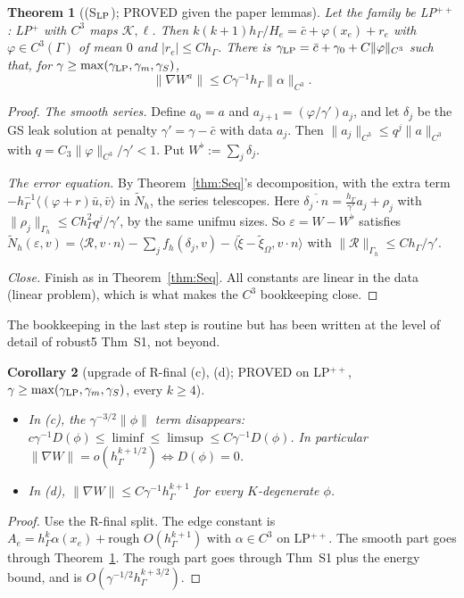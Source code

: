 \documentclass[11pt]{article}
\newtheorem{theorem}{Theorem}[section]
\newtheorem{corollary}[theorem]{Corollary}
\theoremstyle{remark}
\newcommand{\hG}{h_\Gamma}
\newcommand{\Gh}{\Gamma_h}
\newcommand{\ip}[2]{\langle #1,#2\rangle}
\begin{document}
\begin{theorem}[(S$_{\rm LP}$); PROVED given the paper lemmas]\label{thm:SLP}
Let the family be LP$^{++}$: LP$^+$ with $C^3$ maps $\mathcal K,\ell$. Then $k(k+1)\hG/H_e=\bar c+\varphi(x_e)+r_e$ with
$\varphi\in C^3(\Gamma)$ of mean $0$ and $|r_e|\le C\hG$. There is $\gamma_{\rm LP}=\bar c+\gamma_0+C\|\varphi\|_{C^3}$ such that, for
$\gamma\ge\max(\gamma_{\rm LP},\gamma_m,\gamma_S)$,
\[
\|\nabla W^a\|\le C\gamma^{-1}\hG\|\alpha\|_{C^3}.
\]
\end{theorem}
\begin{proof}
\emph{The smooth series.} Define $a_0=a$ and $a_{j+1}=(\varphi/\gamma')a_j$, and let $\delta_j$ be the GS leak solution at penalty $\gamma'=\gamma-\bar c$ with data
$a_j$. Then $\|a_j\|_{C^3}\le q^j\|a\|_{C^3}$ with $q=C_3\|\varphi\|_{C^3}/\gamma'<1$. Put $W^\flat:=\sum_j\delta_j$.

\emph{The error equation.} By Theorem~\ref{thm:Seq}'s decomposition, with the extra term $-\hG^{-1}\ip{(\varphi+r)\bar u}{\bar v}$ in $\tilde N_h$, the series telescopes.
Here $\overline{\delta_j\cdot n}=\frac{\hG}{\gamma'}a_j+\rho_j$ with $\|\rho_j\|_{\Gh}\le C\hG^2q^j/\gamma'$, by the same unifmu sizes. So
$\varepsilon=W-W^\flat$ satisfies $\tilde N_h(\varepsilon,v)=\ip{\mathcal R}{v\cdot n}-\sum_jf_h(\delta_j,v)-\ip{\tilde\xi-\tilde\xi_\Omega}{v\cdot n}$ with
$\|\mathcal R\|_{\Gh}\le C\hG/\gamma'$.

\emph{Close.} Finish as in Theorem~\ref{thm:Seq}. All constants are linear in the data (linear problem), which is what makes the $C^3$ bookkeeping
close.
\end{proof}
\noindent The bookkeeping in the last step is routine but has been written at the level of detail of robust5 Thm~S1, not beyond.

\begin{corollary}[upgrade of R-final (c), (d); PROVED on LP$^{++}$, $\gamma\ge\max(\gamma_{\rm LP},\gamma_m,\gamma_S)$, every $k\ge4$]\label{cor:Rc}
\begin{itemize}
\item In (c), the $\gamma^{-3/2}\|\phi\|$ term disappears: $c\gamma^{-1}D(\phi)\le\liminf\le\limsup\le C\gamma^{-1}D(\phi)$. In particular
$\|\nabla W\|=o(\hG^{k+1/2})\iff D(\phi)=0$.
\item In (d), $\|\nabla W\|\le C\gamma^{-1}\hG^{k+1}$ for every $K$-degenerate $\phi$.
\end{itemize}
\end{corollary}
\begin{proof}
Use the R-final split. The edge constant is $A_e=\hG^k\alpha(x_e)+\text{rough }O(\hG^{k+1})$ with $\alpha\in C^3$ on LP$^{++}$. The smooth part goes through Theorem~\ref{thm:SLP}.
The rough part goes through Thm~S1 plus the energy bound, and is $O(\gamma^{-1/2}\hG^{k+3/2})$.
\end{proof}
\end{document}
